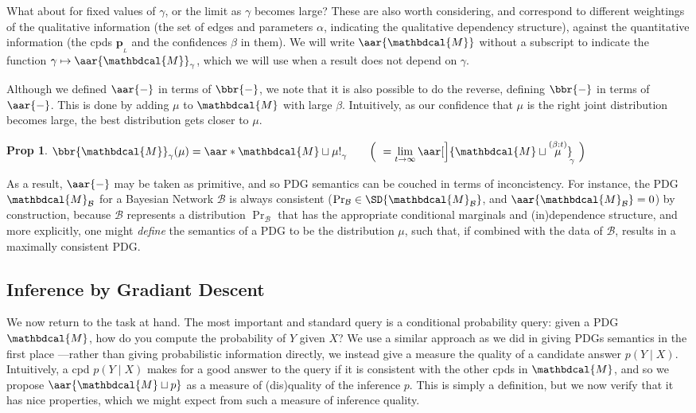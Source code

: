 \documentclass{article}
\theoremstyle{plain}
\newtheorem{prop}[theorem]{Prop}
\theoremstyle{definition}
\theoremstyle{remark}
\newcommand\mat[1]{\mathbf{#1}}
\newcommand{\bp}[1][L]{\mat{p}_{\!_{#1}\!}}
\newcommand{\dg}[1]{\mathbdcal{#1}}
\newcommand\smid{\!\mid\!}
\newcommand{\bundle}{\mathbin{\sqcup}}
\newcommand{\PDGof}[1]{{\dg M}_{#1}}
\begin{document}
What about for fixed values of $\gamma$, or the limit as $\gamma$ becomes large?
These are also worth considering, and correspond to different weightings of the
qualitative information (the set of edges and parameters $\alpha$, indicating the qualitative dependency structure), against the quantitative information (the
cpds $\bp{}$ and the confidences $\beta$ in them).
We will write $\aar{\dg M}$ without a subscript to indicate the function
$\gamma \mapsto \aar{\dg M}_\gamma$, which we will use when a result does not
depend on $\gamma$.

Although we defined $\aar{-}$ in terms of $\bbr{-}$,
we note that it is also possible to do the reverse,
defining $\bbr{-}$ in terms of $\aar{-}$.
This is done by adding $\mu$ to $\dg M$ with large $\beta$.
Intuitively, as our confidence that $\mu$ is the right
joint distribution becomes large, the best distribution
gets closer to $\mu$.

\begin{prop} \label{prop:sementics-via-inconsistency}
	$\displaystyle
		\bbr{\dg M}_\gamma(\mu)
			=  \aar*{\dg M \bundle \mu!}_\gamma
			\qquad\Big(~= \lim_{t \to \infty} \aar[\Big]{\dg M \bundle \overset{(\beta:t)}\mu}_{\!\!\gamma}
				~\Big)
	$
\end{prop}

As a result, $\aar{-}$  may be taken as primitive, and so PDG
semantics can be couched in terms of inconcistency. For instance, the
PDG $\PDGof{\mathcal B}$ for a Bayesian Network $\mathcal B$ is always
consistent ($\Pr_{\mathcal B} \in \SD{\PDGof{\mathcal B}}$, and $\aar{\PDGof{\mathcal B}} = 0$)
by construction, because $\mathcal B$ represents a distribution
$\Pr_{\mathcal B}$ that has the appropriate conditional marginals and
(in)dependence structure, and more explicitly, one might \emph{define}
the semantics of a PDG to be the distribution $\mu$, such that, if combined
with the data of $\mathcal B$, results in a maximally consistent PDG.


\subsection{Inference by Gradiant Descent}

We now return to the task at hand.
The most important and standard query is a conditional probability
query: given a PDG $\dg M$, how do you compute the probability of $Y$ given $X$?
We use a similar approach as we did in giving PDGs semantics in the first place
---rather than giving probabilistic information directly, we instead give a
measure the quality of a candidate answer $p(Y\smid X)$.
Intuitively, a cpd $p(Y\smid X)$ makes for a good answer to the query
if it is consistent with the other cpds in $\dg M$, and so we propose
$\aar{\dg M \bundle p}$ as a measure of (dis)quality of the inference $p$.
This is simply a definition, but we now verify that it has nice properties,
which we might expect from such a measure of inference quality.
\end{document}
